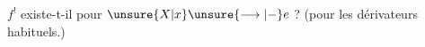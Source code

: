 
$f^{!}$ existe-t-il pour $\unsure{X|x}\unsure{\longrightarrow|-}e$ ? (pour les dérivateurs habituels.)

